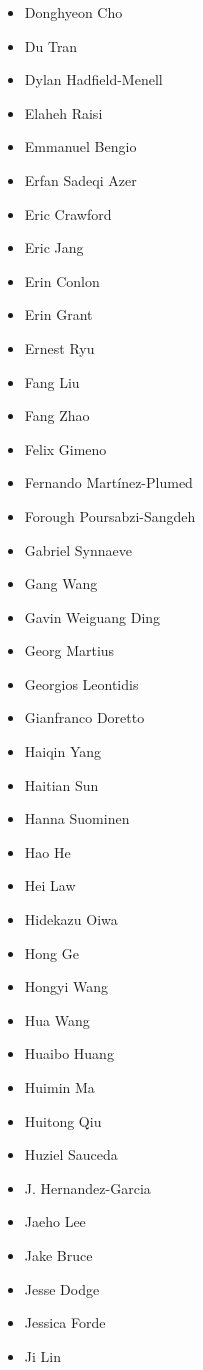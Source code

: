\begin{multicols}{4}
\begin{itemize}[label={}]
    \item Donghyeon Cho
    \item Du Tran
    \item Dylan Hadfield-Menell
    \item Elaheh Raisi
    \item Emmanuel Bengio
    \item Erfan Sadeqi Azer
    \item Eric Crawford
    \item Eric Jang
    \item Erin Conlon
    \item Erin Grant
    \item Ernest Ryu
    \item Fang Liu
    \item Fang Zhao
    \item Felix Gimeno
    \item Fernando Martínez-Plumed
    \item Forough Poursabzi-Sangdeh
    \item Gabriel Synnaeve
    \item Gang Wang
    \item Gavin Weiguang Ding
    \item Georg Martius
    \item Georgios Leontidis
    \item Gianfranco Doretto
    \item Haiqin Yang
    \item Haitian Sun
    \item Hanna Suominen
    \item Hao He
    \item Hei Law
    \item Hidekazu Oiwa
    \item Hong Ge
    \item Hongyi Wang
    \item Hua Wang
    \item Huaibo Huang
    \item Huimin Ma
    \item Huitong Qiu
    \item Huziel Sauceda
    \item J. Hernandez-Garcia
    \item Jaeho Lee
    \item Jake Bruce
    \item Jesse Dodge
    \item Jessica Forde
    \item Ji Lin

\end{itemize}
\end{multicols}
